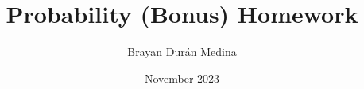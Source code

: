 \documentclass{report}
\title{Probability (Bonus) Homework}
\author{Brayan Durán Medina}
\date{November 2023}
\begin{document}
\maketitle



\break


\end{document}
